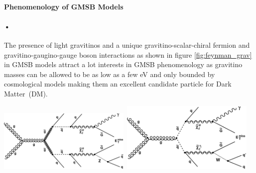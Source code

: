{\paragraph{Phenomenology of GMSB Models}
\paragraph*{•}
The presence of light gravitinos and a unique gravitino-scalar-chiral fermion and gravitino-gaugino-gauge boson interactions as shown in figure \ref{fig:feynman_grav}  in GMSB models attract a lot interests in GMSB phenomenology as gravitino masses can be allowed to be as low as a few eV and only bounded by cosmological models making them an excellent candidate particle for Dark Matter~(DM).

\begin{center}
\centering
\mbox{\includegraphics[width=2.5in]{THESISPLOTS/SinglePhoton_gluino.pdf} \quad \quad
\includegraphics[width=2.5in]{THESISPLOTS/SinglePhoton_squark.pdf}}
\label{fig:feynman_grav}
\end{center}

}
